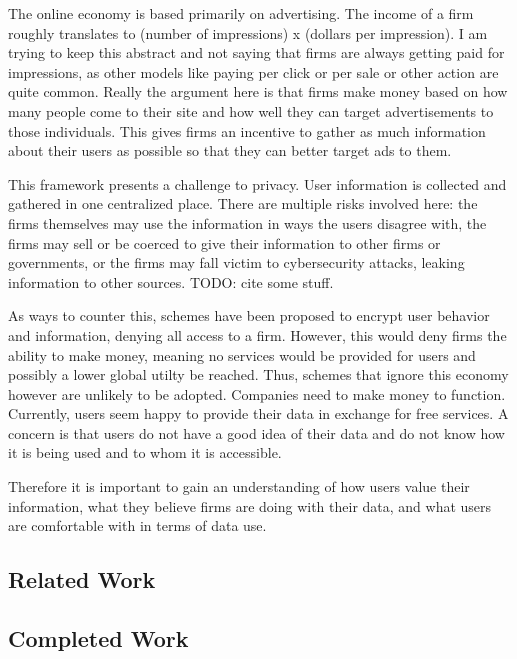 
The online economy is based primarily on advertising.
The income of a firm roughly translates to (number of impressions) x (dollars per impression).
I am trying to keep this abstract and not saying that firms are always getting paid for impressions, as other models like paying per click or per sale or other action are quite common.
Really the argument here is that firms make money based on how many people come to their site and how well they can target advertisements to those individuals.
This gives firms an incentive to gather as much information about their users as possible so that they can better target ads to them.

This framework presents a challenge to privacy.
User information is collected and gathered in one centralized place.
There are multiple risks involved here: the firms themselves may use the information in ways the users disagree with, the firms may sell or be coerced to give their information to other firms or governments, or the firms may fall victim to cybersecurity attacks, leaking information to other sources.
TODO: cite some stuff.

As ways to counter this, schemes have been proposed to encrypt user behavior and information, denying all access to a firm.
However, this would deny firms the ability to make money, meaning no services would be provided for users and possibly a lower global utilty be reached.
Thus, schemes that ignore this economy however are unlikely to be adopted.
Companies need to make money to function.
Currently, users seem happy to provide their data in exchange for free services.
A concern is that users do not have a good idea of their data and do not know how it is being used and to whom it is accessible.

Therefore it is important to gain an understanding of how users value their information, what they believe firms are doing with their data, and what users are comfortable with in terms of data use.


\subsection{Related Work}


\subsection{Completed Work}


